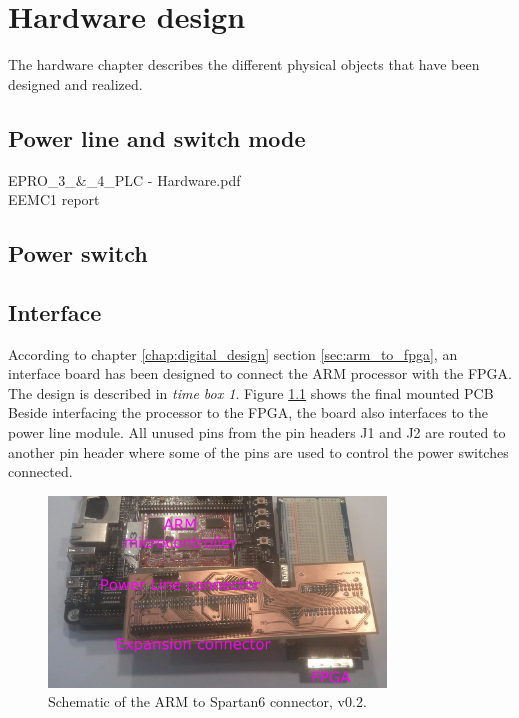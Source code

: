 \chapter{Hardware design}
The hardware chapter describes the different physical objects that have been designed and realized. 
\section{Power line and switch mode}
%
EPRO\_3\_\&\_4\_PLC - Hardware.pdf
\\ EEMC1 report
\p 

\section{Power switch}
%

\section{Interface}
According to chapter \ref{chap:digital_design} section \ref{sec:arm_to_fpga}, an interface board has been designed to connect the ARM processor with the FPGA. 
The design is described in \textit{time box 1}. Figure \ref{fig:arm2fpga_interface} shows the final mounted PCB
\p Beside interfacing the processor to the FPGA, the board also interfaces to the power line module. 
\p All unused pins from the pin headers J1 and J2 are routed to another pin header where some of the pins are used to control the power switches connected.
 
\begin{figure}[H]
	\begin{centering}
		 \includegraphics[width=0.80\textwidth]{images/hw_interface_photo_v0_2.jpg}
		\caption{Schematic of the ARM to Spartan6 connector, v0.2.}
		\label{fig:arm2fpga_interface}
	\end{centering}
\end{figure}

